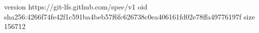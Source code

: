 version https://git-lfs.github.com/spec/v1
oid sha256:4266f74fe42f1c591ba4beb57f6fc626738c0ea406161fd02e78ffa49776197f
size 156712
